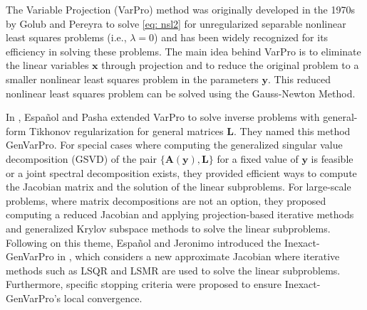 \documentclass[onefignum,onetabnum]{siamart171218}
\begin{document}
The Variable Projection (VarPro) method was originally developed in the 1970s by Golub and Pereyra \cite{golub1973differentiation} to solve \eqref{eq: nsl2} for unregularized separable nonlinear least squares problems (i.e., $\lambda=0$) and has been widely recognized for its efficiency in solving these problems. The main idea behind VarPro is to eliminate the linear variables $\mathbf{x}$ through projection and to reduce the original problem to a smaller nonlinear least squares problem in the parameters $\mathbf{y}$. This reduced nonlinear least squares problem can be solved using the Gauss-Newton Method.

In \cite{Espanol_2023}, Espa\~nol and Pasha extended VarPro to solve inverse problems with general-form Tikhonov regularization for general matrices $\mathbf{L}$. They named this method GenVarPro. For special cases where computing the generalized singular value decomposition (GSVD) of the pair $\{\mathbf{A}(\mathbf{y}),\mathbf{L}\}$ for a fixed value of $\mathbf{y}$ is feasible or a joint spectral decomposition exists, they provided efficient ways to compute the Jacobian matrix and the solution of the linear subproblems. For large-scale problems, where matrix decompositions are not an option, they proposed computing a reduced Jacobian and applying projection-based iterative methods and generalized Krylov subspace methods to solve the linear subproblems.
Following on this theme, Espa\~nol and Jeronimo introduced the Inexact-GenVarPro in \cite{espanol2025local}, which considers a new approximate Jacobian where iterative methods such as LSQR and LSMR are used to solve the linear subproblems. Furthermore, specific stopping criteria were proposed to ensure Inexact-GenVarPro's local convergence.
\end{document}
